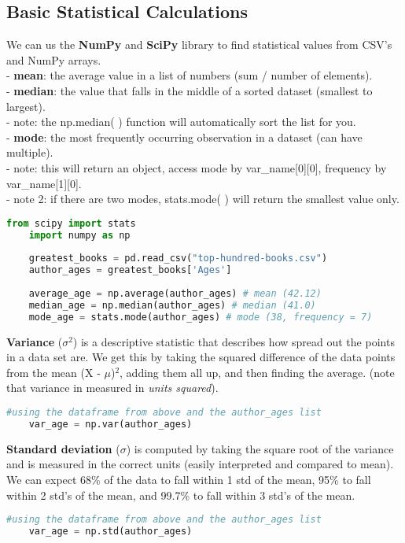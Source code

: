 \documentclass[11pt, a4paper]{article}
\begin{document}
\begin{spacing}{1.1}
	\subsection{Basic Statistical Calculations}
	We can us the \textbf{NumPy} and \textbf{SciPy} library to find statistical values from CSV's and NumPy arrays. \\
	\hspace*{3mm} - \textbf{mean}: the average value in a list of numbers (sum / number of elements). \\
	\hspace*{3mm} - \textbf{median}: the value that falls in the middle of a sorted dataset (smallest to largest). \\
	\hspace*{8mm} - note: the np.median( ) function will automatically sort the list for you. \\
	\hspace*{3mm} - \textbf{mode}: the most frequently occurring observation in a dataset (can have multiple).\\
	\hspace*{8mm} - note: this will return an object, access mode by var\_name[0][0], frequency by var\_name[1][0]. \\
	\hspace*{8mm} - note 2: if there are two modes, stats.mode( ) will return the smallest value only.
	\begin{lstlisting}[language=Python]
	from scipy import stats
	import numpy as np
	
	greatest_books = pd.read_csv("top-hundred-books.csv")
	author_ages = greatest_books['Ages']
	
	average_age = np.average(author_ages) # mean (42.12)
	median_age = np.median(author_ages) # median (41.0)
	mode_age = stats.mode(author_ages) # mode (38, frequency = 7) \end{lstlisting}\vspace*{1mm}
	\textbf{Variance} ($\sigma^2$) is a descriptive statistic that describes how spread out the points in a data set are. We get this by taking the squared difference of the data points from the mean (X - $\mu$)$^2$, adding them all up, and then finding the average. (note that variance in measured in \textit{units squared}).
	\begin{lstlisting}[language=Python]
	#using the dataframe from above and the author_ages list
	var_age = np.var(author_ages) \end{lstlisting}\vspace*{1mm}
	\textbf{Standard deviation} ($\sigma$) is computed by taking the square root of the variance and is measured in the correct units (easily interpreted and compared to mean). We can expect 68\% of the data to fall within 1 std of the mean, 95\% to fall within 2 std's of the mean, and 99.7\% to fall within 3 std's of the mean.
	\begin{lstlisting}[language=Python]
	#using the dataframe from above and the author_ages list
	var_age = np.std(author_ages) \end{lstlisting}\vspace*{4mm}
	

\end{spacing}
\end{document}
